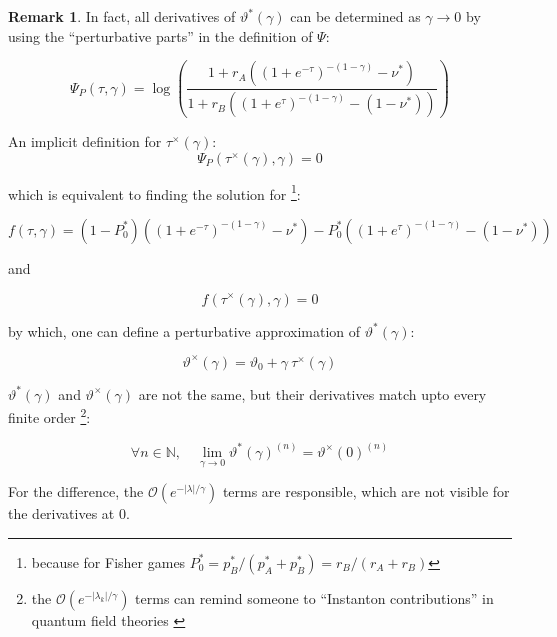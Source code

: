 \documentclass{article}
\theoremstyle{definition}
\newtheorem*{remark}{Remark}
\begin{document}
\begin{remark}
    In fact, all derivatives of $\vartheta^*(\gamma)$ can be determined as $\gamma \to 0$ by using the ``perturbative parts'' in the definition of $\Psi$:

    \begin{equation}
        \Psi_P(\tau,\gamma) = 
        \log \left (
        \frac
        {1 + r_A \left ( \left (1 + e^{-\tau} \right )^{-(1-\gamma)} - \nu^* \right)}
        {1 + r_B \left ( \left (1 + e^{\tau} \right )^{-(1-\gamma)} - (1-\nu^*) \right )}
        \right )
    \end{equation}

    An implicit definition for $\tau^\times(\gamma)$:
    \begin{equation}
        \Psi_P(\tau^\times(\gamma),\gamma) = 0
    \end{equation}

    which is equivalent to finding the solution for \footnote{because for Fisher games $P^*_0 = p^*_B/(p^*_A + p^*_B)=r_B/(r_A+r_B)$}:

    \begin{equation}
        f(\tau,\gamma) = 
        (1-P^*_0) \left ( \left (1 + e^{-\tau} \right )^{-(1-\gamma)} - \nu^* \right) - 
        P^*_0 \left ( \left (1 + e^{\tau} \right )^{-(1-\gamma)} - (1-\nu^*) \right )
    \end{equation}

    and

    \begin{equation}
        f(\tau^\times(\gamma),\gamma) = 0
    \end{equation}

    by which, one can define a perturbative approximation of $\vartheta^*(\gamma)$:

    \begin{equation}
        \vartheta^\times(\gamma) = \vartheta_0 + \gamma \ \tau^\times(\gamma)
    \end{equation}

    $\vartheta^*(\gamma)$ and $\vartheta^\times(\gamma)$ are not the same, but their derivatives match upto every finite order \cite{note:AsymptoticSeries} \footnote{the $\mathcal{O}(e^{-|\lambda_k|/\gamma})$ terms can remind someone to ``Instanton contributions'' in quantum field theories \cite{arxiv:Instantons}}:

    \begin{equation}
        \forall n \in \mathbb{N}, \quad 
        \lim_{\gamma \to 0} \vartheta^*(\gamma)^{(n)} = \vartheta^\times(0)^{(n)}
    \end{equation}

    For the difference, the $\mathcal{O}(e^{-|\lambda|/\gamma})$ terms are responsible, which are not visible for the derivatives at 0.
    
\end{remark}
\end{document}
